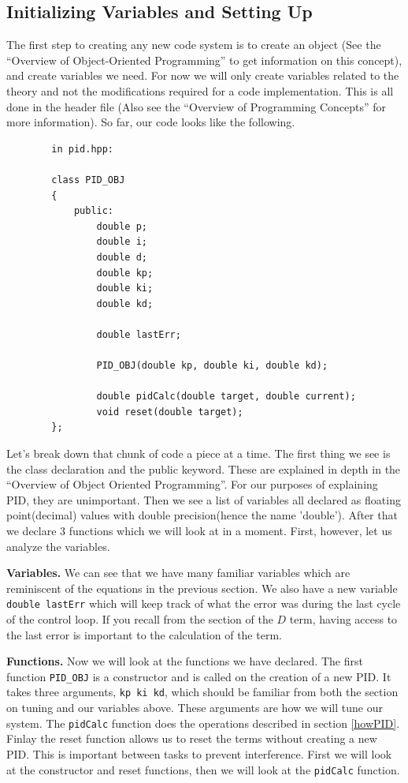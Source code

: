 \documentclass[12pt]{article}
\begin{document}
\subsection{Initializing Variables and Setting Up}
    The first step to creating any new code system is to create an object (See the ``Overview of Object-Oriented Programming'' to get information on this concept), and create variables we need. For now we will only create variables related to the theory and not the modifications required for a code implementation. This is all done in the header file (Also see the ``Overview of Programming Concepts'' for more information). So far, our code looks like the following.

    \begin{verbatim}
        in pid.hpp:

        class PID_OBJ
        {
            public:
                double p;
                double i;
                double d;
                double kp;
                double ki;
                double kd;

                double lastErr;

                PID_OBJ(double kp, double ki, double kd);

                double pidCalc(double target, double current);
                void reset(double target);
        };
    \end{verbatim}

    Let's break down that chunk of code a piece at a time. The first thing we see is the class declaration and the public keyword. These are explained in depth in the ``Overview of Object Oriented Programming''. For our purposes of explaining PID, they are unimportant. Then we see a list of variables all declared as floating point(decimal) values with double precision(hence the name 'double'). After that we declare 3 functions which we will look at in a moment. First, however, let us analyze the variables.

   \textbf{Variables.} We can see that we have many familiar variables which are reminiscent of the equations in the previous section. We also have a new variable \verb|double lastErr| which will keep track of what the error was during the last cycle of the control loop. If you recall from the section of the $D$ term, having access to the last error is important to the calculation of the term.

    \textbf{Functions.} Now we will look at the functions we have declared. The first function \verb|PID_OBJ| is a constructor and is called on the creation of a new PID. It takes three arguments, \verb|kp ki kd|, which should be familiar from both the section on tuning and our variables above. These arguments are how we will tune our system. The \verb|pidCalc| function does the operations described in section \ref{howPID}. Finlay the reset function allows us to reset the terms without creating a new PID. This is important between tasks to prevent interference. First we will look at the constructor and reset functions, then we will look at the \verb|pidCalc| function.
\end{document}

